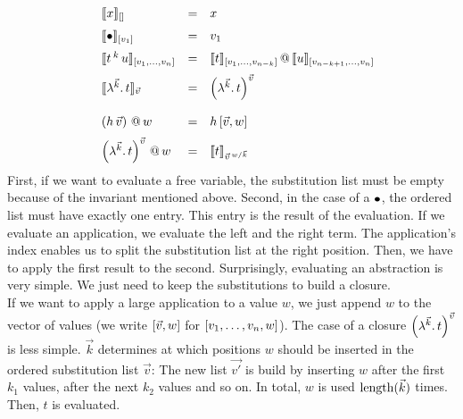 \documentclass[submission,copyright,creativecommons]{eptcs}
\begin{document}
\[ 
\begin{array}{llll}
& \ev x {\emptyVec} & = & x \\ \noalign{\medskip}
& \ev \ovar {\ve{v_1}} & = & v_1 \\  \noalign{\medskip}
& \ev {t \oapp k u} {\ve{v_1, \ldots, v_n}} & = & {\ev t {\ve{v_1, \ldots, v_{n-k}}}} \ap {\ev u {\ve{v_{n-k+1}, \ldots, v_n}}} \\  \noalign{\medskip}
& \ev {\LaO {\vec k} t}  {\vec v} & = & \Val {\vec k} t {\vec v} \\  
\\ 
& \pa{h \sspace \vec v} \ap w & = & h \sspace \ve{\vec v, w} 
\\ \noalign{\medskip}
& \Val{\vec k} t {\vec v}   \ap w & = & \ev t {\multiinsert{\vec v}{\vec k}{w}}
\end{array}
\]
First, if we want to evaluate a free variable, the substitution list must be empty because of the invariant mentioned above. 
Second, in the case of a $\mathord{\bullet}$, the ordered list must have exactly one entry. This entry is the result of the evaluation. 
If we evaluate an application, we evaluate the left and the right term. The application's index enables us to split the substitution list at the right position. Then, we have to apply the first result to the second. 
Surprisingly, evaluating an abstraction is very simple. We just need to keep the substitutions to build a closure. \\
If we want to apply a large application to a value $w$, we just append $w$ to the vector of values (we write $[\vec v, w]$ for $[v_1, \ldots, v_n, w]$). 
The case of a closure $\left(\lambda^{\vec k} . \, {t} \right)^{\vec v}$ is less simple. $\vec k$ determines at which positions $w$ should be inserted in the ordered substitution list $\vec v$: The new list $\vec {v'}$ is build by inserting $w$ after the first $k_1$ values, after the next $k_2$ values and so on. In total, $w$ is used $\mbox{length}(\vec k)$ times. Then, $t$ is evaluated.

\end{document}
